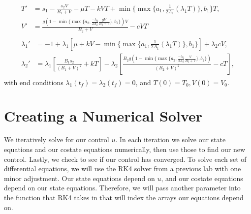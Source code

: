 \begin{align}
	\begin{split}
		T'&=s_1-\frac{s_2V}{B_1+V}-\mu T-kVT+\min\{\max\{a_1,\frac{1}{2A_1}(\lambda_1T)\},b_1\}T,\\
		V'&=\frac{g(1-\min\{\max\{a_2,\frac{-\lambda_2}{2A_2}\frac{gV}{B_2+V}\},b_2\})V}{B_2+V}-cVT
	\end{split} \label{modified_state:HIV}\\
	\begin{split}
		\lambda_1'&=-1+\lambda_1\left[\mu+kV-\min\{\max\{a_1,\frac{1}{2A_1}(\lambda_1T)\},b_1\}\right]+\lambda_2cV,\\
		\lambda_2'&=\lambda_1\left[\frac{B_1s_2}{(B_1+V)^2}+kT\right]-\lambda_2\left[\frac{B_2g(1-\min\{\max\{a_2,\frac{-\lambda_2}{2A_2}\frac{V}			{B_2+V}\},b_2\})}{(B_2+V)^2}-cT\right],
	\end{split}
\end{align}
with end conditions $\lambda_1(t_f)=\lambda_2(t_f)=0$, and $T(0)=T_0,V(0)=V_0$.

\section*{Creating a Numerical Solver}

We iteratively solve for our control $u$.
In each iteration we solve our state equations and our costate equations numerically, then use those to find our new control.
Lastly, we check to see if our control has converged.
To solve each set of differential equations, we will use the RK4 solver from a previous lab with one minor adjustment.
Our state equations depend on $u$, and our costate equations depend on our state equations.
Therefore, we will pass another parameter into the function that RK4 takes in that will index the arrays our equations depend on.

